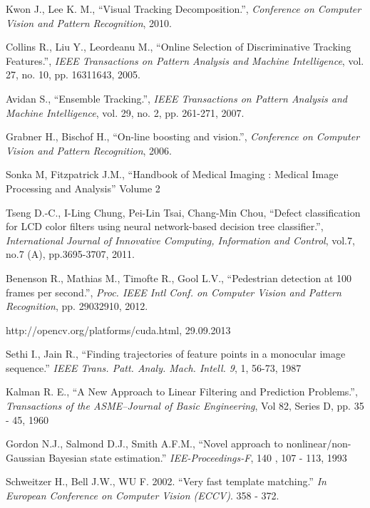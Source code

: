 \begin{thebibliography}{SMAT}
 Kwon J., Lee K. M., ``Visual Tracking Decomposition.'', \textit{Conference on Computer Vision and Pattern Recognition}, 2010.

 Collins R., Liu Y., Leordeanu M., ``Online Selection of Discriminative Tracking Features.'', \textit{IEEE Transactions on Pattern Analysis and Machine Intelligence}, vol. 27, no. 10, pp. 1631\textendash{}1643, 2005.

 Avidan S., ``Ensemble Tracking.'', \textit{IEEE Transactions on Pattern Analysis and Machine Intelligence}, vol. 29, no. 2, pp. 261-271, 2007.

 Grabner H., Bischof H., ``On-line boosting and vision.'', \textit{Conference on Computer Vision and Pattern Recognition}, 2006.

 Sonka M, Fitzpatrick J.M., ``Handbook of Medical Imaging : Medical Image Processing and Analysis'' Volume 2

 Tseng D.-C., I-Ling Chung, Pei-Lin Tsai, Chang-Min Chou, ``Defect classification for LCD color filters using neural network-based decision tree classifier.'',\textit{ International Journal of Innovative Computing, Information and Control}, vol.7, no.7 (A), pp.3695-3707, 2011.

 Benenson R., Mathias M., Timofte R., Gool L.V., ``Pedestrian detection at 100 frames per second.'', \textit{Proc. IEEE Intl Conf. on Computer Vision and Pattern Recognition}, pp. 2903\textendash{}2910, 2012.

http://opencv.org/platforms/cuda.html, 29.09.2013

 Sethi I., Jain R., ``Finding trajectories of feature points in a monocular image sequence.'' \textit{IEEE Trans. Patt. Analy. Mach. Intell. 9}, 1, 56-73, 1987

 Kalman R. E., ``A New Approach to Linear Filtering and Prediction Problems.'', \textit{Transactions of the ASME--Journal of Basic Engineering}, Vol 82, Series D, pp. 35 - 45, 1960

 Gordon N.J., Salmond D.J., Smith A.F.M., ``Novel approach to nonlinear/non-Gaussian Bayesian state estimation.'' \textit{IEE-Proceedings-F}, 140 , 107 - 113, 1993

 Schweitzer H., Bell J.W., WU F. 2002. ``Very fast template matching.'' \textit{In European Conference on Computer Vision (ECCV)}. 358 - 372.


\end{thebibliography}
